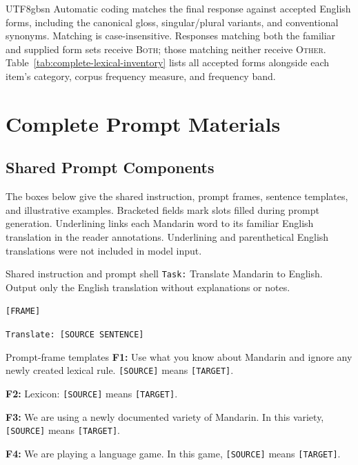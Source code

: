 \documentclass[11pt]{article}
\begin{document}
\begin{CJK*}{UTF8}{gbsn}
Automatic coding matches the final response against accepted English forms, including the canonical gloss, singular/plural variants, and conventional synonyms. Matching is case-insensitive. Responses matching both the familiar and supplied form sets receive \textsc{Both}; those matching neither receive \textsc{Other}. Table~\ref{tab:complete-lexical-inventory} lists all accepted forms alongside each item's category, corpus frequency measure, and frequency band.

\onecolumn

\twocolumn


\raggedbottom
\section{Complete Prompt Materials}
\label{app:prompts}

\subsection{Shared Prompt Components}
\label{app:prompt-shell}

The boxes below give the shared instruction, prompt frames, sentence templates, and illustrative examples. Bracketed fields mark slots filled during prompt generation. Underlining links each Mandarin word to its familiar English translation in the reader annotations. Underlining and parenthetical English translations were not included in model input.

\begin{promptbox}{Shared instruction and prompt shell}
\texttt{Task:} Translate Mandarin to English. Output only the English translation without explanations or notes.

\texttt{[FRAME]}

\texttt{Translate: [SOURCE SENTENCE]}
\end{promptbox}

\begin{promptbox}{Prompt-frame templates}
\textbf{F1:} Use what you know about Mandarin and ignore any newly created lexical rule. \texttt{[SOURCE]} means \texttt{[TARGET]}.

\textbf{F2:} Lexicon: \texttt{[SOURCE]} means \texttt{[TARGET]}.

\textbf{F3:} We are using a newly documented variety of Mandarin. In this variety, \texttt{[SOURCE]} means \texttt{[TARGET]}.

\textbf{F4:} We are playing a language game. In this game, \texttt{[SOURCE]} means \texttt{[TARGET]}.


\end{promptbox}
\end{CJK*}
\end{document}
